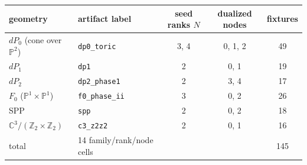 \begin{tabular}{llccc}
\toprule
geometry & artifact label & seed ranks $N$ & dualized nodes & fixtures \\
\midrule
$dP_0$ (cone over $\mathbb{P}^2$) & \texttt{dp0\_toric} & 3, 4 & 0, 1, 2 & 49 \\
$dP_1$ & \texttt{dp1} & 2 & 0, 1 & 19 \\
$dP_2$ & \texttt{dp2\_phase1} & 2 & 3, 4 & 17 \\
$F_0$ ($\mathbb{P}^1\times\mathbb{P}^1$) & \texttt{f0\_phase\_ii} & 3 & 0, 2 & 26 \\
SPP & \texttt{spp} & 2 & 0, 2 & 18 \\
$\mathbb{C}^3/(\mathbb{Z}_2\times\mathbb{Z}_2)$ & \texttt{c3\_z2z2} & 2 & 0, 1 & 16 \\
\midrule
total & 14 family/rank/node cells & & & 145 \\
\bottomrule
\end{tabular}
